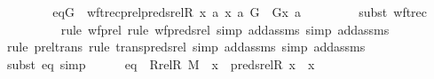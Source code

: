 \begin{isabellebody}
\isanewline
\ \ \ \ \isamarkupfalse%
\ \isamarkupfalse%
\ eqG\ {\isacharcolon}{\kern0pt}\ {\isachardoublequoteopen}wftrec{\isacharparenleft}{\kern0pt}prel{\isacharparenleft}{\kern0pt}preds{\isacharunderscore}{\kern0pt}rel{\isacharparenleft}{\kern0pt}R{\isacharcomma}{\kern0pt}\ x{\isacharparenright}{\kern0pt}{\isacharcomma}{\kern0pt}\ {\isacharbraceleft}{\kern0pt}a{\isacharbraceright}{\kern0pt}{\isacharparenright}{\kern0pt}{\isacharcomma}{\kern0pt}\ {\isacharless}{\kern0pt}x{\isacharcomma}{\kern0pt}\ a{\isachargreater}{\kern0pt}{\isacharcomma}{\kern0pt}\ G{\isacharparenright}{\kern0pt}\ {\isacharequal}{\kern0pt}\ G{\isacharparenleft}{\kern0pt}{\isacharless}{\kern0pt}x{\isacharcomma}{\kern0pt}\ a{\isachargreater}{\kern0pt}{\isacharcomma}{\kern0pt}\ {}{\isacharparenright}{\kern0pt}{\isachardoublequoteclose}\ \isanewline
\ \ \ \ \ \ \isamarkupfalse%
{\isacharparenleft}{\kern0pt}subst\ wftrec{\isacharparenright}{\kern0pt}\isanewline
\ \ \ \ \ \ \ \ \isamarkupfalse%
{\isacharparenleft}{\kern0pt}rule\ wf{\isacharunderscore}{\kern0pt}prel{\isacharcomma}{\kern0pt}\ rule\ wf{\isacharunderscore}{\kern0pt}preds{\isacharunderscore}{\kern0pt}rel{\isacharcomma}{\kern0pt}\ simp\ add{\isacharcolon}{\kern0pt}assms{\isacharcomma}{\kern0pt}\ simp\ add{\isacharcolon}{\kern0pt}assms{\isacharparenright}{\kern0pt}\isanewline
\ \ \ \ \ \ \ \isamarkupfalse%
{\isacharparenleft}{\kern0pt}rule\ prel{\isacharunderscore}{\kern0pt}trans{\isacharcomma}{\kern0pt}\ rule\ trans{\isacharunderscore}{\kern0pt}preds{\isacharunderscore}{\kern0pt}rel{\isacharcomma}{\kern0pt}\ simp\ add{\isacharcolon}{\kern0pt}assms{\isacharcomma}{\kern0pt}\ simp\ add{\isacharcolon}{\kern0pt}assms{\isacharparenright}{\kern0pt}\isanewline
\ \ \ \ \ \ \isamarkupfalse%
{\isacharparenleft}{\kern0pt}subst\ eq{}{\isacharprime}{\kern0pt}{\isacharcomma}{\kern0pt}\ simp{\isacharparenright}{\kern0pt}\isanewline
\isanewline
\ \ \ \ \isamarkupfalse%
\ eq{}{\isacharprime}{\kern0pt}{\isacharprime}{\kern0pt}\ {\isacharcolon}{\kern0pt}\ {\isachardoublequoteopen}Rrel{\isacharparenleft}{\kern0pt}R{\isacharcomma}{\kern0pt}\ M{\isacharparenright}{\kern0pt}\ {\isacharminus}{\kern0pt}{\isacharbackquote}{\kern0pt}{\isacharbackquote}{\kern0pt}\ {\isacharbraceleft}{\kern0pt}x{\isacharbraceright}{\kern0pt}\ {\isacharequal}{\kern0pt}\ preds{\isacharunderscore}{\kern0pt}rel{\isacharparenleft}{\kern0pt}R{\isacharcomma}{\kern0pt}\ x{\isacharparenright}{\kern0pt}\ {\isacharminus}{\kern0pt}{\isacharbackquote}{\kern0pt}{\isacharbackquote}{\kern0pt}\ {\isacharbraceleft}{\kern0pt}x{\isacharbraceright}{\kern0pt}{\isachardoublequoteclose}\ \isanewline

\end{isabellebody}
